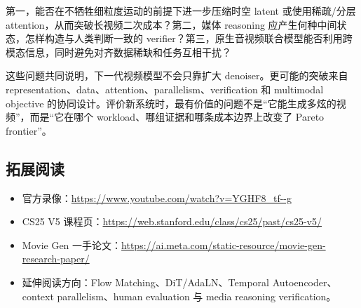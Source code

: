 \documentclass[a4paper]{article}
\begin{document}
第一，能否在不牺牲细粒度运动的前提下进一步压缩时空 latent 或使用稀疏/分层 attention，从而突破长视频二次成本？第二，媒体 reasoning 应产生何种中间状态，怎样构造与人类判断一致的 verifier？第三，原生音视频联合模型能否利用跨模态信息，同时避免对齐数据稀缺和任务互相干扰？

这些问题共同说明，下一代视频模型不会只靠扩大 denoiser。更可能的突破来自 representation、data、attention、parallelism、verification 和 multimodal objective 的协同设计。评价新系统时，最有价值的问题不是“它能生成多炫的视频”，而是“它在哪个 workload、哪组证据和哪条成本边界上改变了 Pareto frontier”。

\subsection{拓展阅读}

\begin{itemize}[itemsep=0.2em,topsep=0.2em]
  \item 官方录像：\url{https://www.youtube.com/watch?v=YGHF8_tf--g}
  \item CS25 V5 课程页：\url{https://web.stanford.edu/class/cs25/past/cs25-v5/}
  \item Movie Gen 一手论文：\url{https://ai.meta.com/static-resource/movie-gen-research-paper/}
  \item 延伸阅读方向：Flow Matching、DiT/AdaLN、Temporal Autoencoder、context parallelism、human evaluation 与 media reasoning verification。
\end{itemize}
\end{document}
